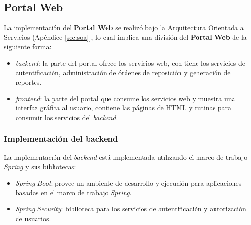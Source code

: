 \subsection{Portal Web}\label{sec:web-portal}
La implementación del \textbf{Portal Web} se realizó bajo la Arquitectura Orientada a Servicios (Apéndice \ref{sec:soa}), lo cual implica una división del \textbf{Portal Web} de la siguiente forma:
\begin{itemize}
	\item \textit{backend}: la parte del portal ofrece los servicios web, con tiene los servicios de autentificación, administración de órdenes de reposición y generación de reportes.
	\item \textit{frontend}: la parte del portal que consume los servicios web y muestra una interfaz gráfica al usuario, contiene las páginas de HTML y rutinas para consumir los servicios del \textit{backend}.
\end{itemize}

\subsubsection{Implementación del backend}\label{sec:backend}
La implementación del \textit{backend} está implementada utilizando el marco de trabajo \textit{Spring} y sus bibliotecas:
\begin{itemize}
 	\item \textit{Spring Boot}: provee un ambiente de desarrollo y ejecución para aplicaciones basadas en el marco de trabajo \textit{Spring}. 
 	\item \textit{Spring Security}: biblioteca para los servicios de autentificación y autorización de usuarios.
\end{itemize}


